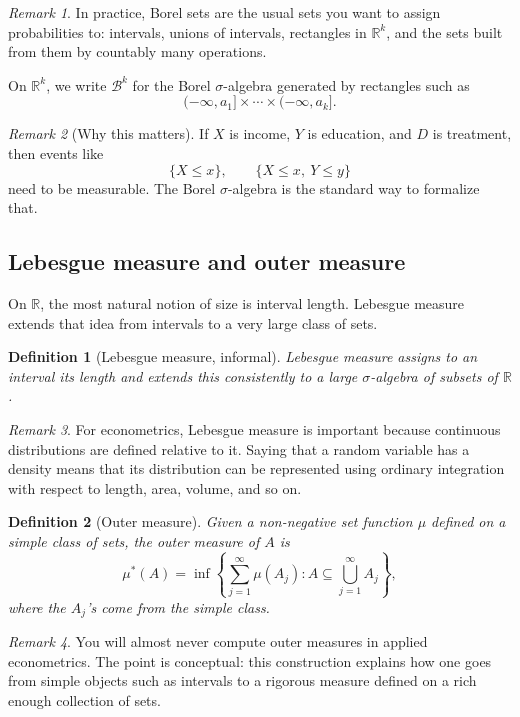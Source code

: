 \documentclass[11pt]{article}
\newtheorem{definition}{Definition}[section]
\theoremstyle{remark}
\newtheorem{remark}{Remark}[section]
\newcommand{\R}{\mathbb{R}}
\newcommand{\1}{\mathbbm{1}}
\newcommand{\cB}{\mathcal{B}}
\begin{document}
\begin{remark}
In practice, Borel sets are the usual sets you want to assign probabilities to: intervals, unions of intervals, rectangles in \(\R^k\), and the sets built from them by countably many operations.
\end{remark}

On \(\R^k\), we write \(\cB^k\) for the Borel \(\sigma\)-algebra generated by rectangles such as
\[
  (-\infty,a_1]\times \cdots \times (-\infty,a_k].
\]

\begin{remark}[Why this matters]
If \(X\) is income, \(Y\) is education, and \(D\) is treatment, then events like
\[
  \{X \le x\}, \qquad \{X \le x,\ Y \le y\}
\]
need to be measurable. The Borel \(\sigma\)-algebra is the standard way to formalize that.
\end{remark}

\subsection{Lebesgue measure and outer measure}

On \(\R\), the most natural notion of size is interval length. Lebesgue measure extends that idea from intervals to a very large class of sets.

\begin{definition}[Lebesgue measure, informal]
Lebesgue measure assigns to an interval its length and extends this consistently to a large \(\sigma\)-algebra of subsets of \(\R\).
\end{definition}

\begin{remark}
For econometrics, Lebesgue measure is important because continuous distributions are defined relative to it. Saying that a random variable has a density means that its distribution can be represented using ordinary integration with respect to length, area, volume, and so on.
\end{remark}

\begin{definition}[Outer measure]
Given a non-negative set function \(\mu\) defined on a simple class of sets, the \emph{outer measure} of \(A\) is
\[
  \mu^*(A) = \inf\left\{\sum_{j=1}^{\infty}\mu(A_j) : A \subseteq \bigcup_{j=1}^{\infty} A_j\right\},
\]
where the \(A_j\)'s come from the simple class.
\end{definition}

\begin{remark}
You will almost never compute outer measures in applied econometrics. The point is conceptual: this construction explains how one goes from simple objects such as intervals to a rigorous measure defined on a rich enough collection of sets.
\end{remark}
\end{document}
